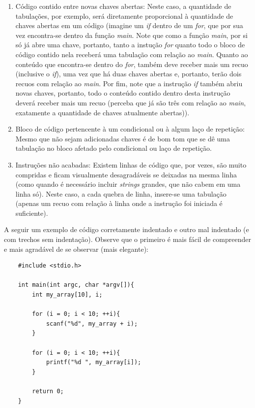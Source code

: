 \documentclass[12pt]{article}
\newcommand\tab[1][1cm]{\hspace*{#1}}
\begin{document}
\begin{enumerate}
    \item Código contido entre novas chaves abertas: Neste caso, a quantidade de tabulações, por exemplo, será diretamente proporcional à quantidade de chaves abertas em um código (imagine um \textit{if} dentro de um \textit{for}, que por sua vez encontra-se dentro da função \textit{main}. Note que como a função \textit{main}, por si só já abre uma chave, portanto, tanto a instução \textit{for} quanto todo o bloco de código contido nela receberá uma tabulação com relação ao \textit{main}. Quanto ao conteúdo que encontra-se dentro do \textit{for}, também deve receber mais um recuo (inclusive o \textit{if}), uma vez que há duas chaves abertas e, portanto, terão dois recuos com relação ao \textit{main}. Por fim, note que a instrução \textit{if} também abriu novas chaves, portanto, todo o conteúdo contido dentro desta instrução deverá receber mais um recuo (perceba que já são três com relação ao \textit{main}, exatamente a quantidade de chaves atualmente abertas)).
    \item Bloco de código pertencente à um condicional ou à algum laço de repetição: Mesmo que não sejam adicionadas chaves é de bom tom que se dê uma tabulação no bloco afetado pelo condicional ou laço de repetição.
    \item Instruções não acabadas: Existem linhas de código que, por vezes, são muito compridas e ficam visualmente desagradáveis se deixadas na mesma linha (como quando é necessário incluir \textit{strings} grandes, que não cabem em uma linha só). Neste caso, a cada quebra de linha, insere-se uma tabulação (apenas um recuo com relação à linha onde a instrução foi iniciada é suficiente).
\end{enumerate}

\par\tab A seguir um exemplo de código corretamente indentado e outro mal indentado (e com trechos sem indentação). Observe que o primeiro é mais fácil de compreender e mais agradável de se observar (mais elegante):

\hspace{0.25cm}
\begin{lstlisting}
    #include <stdio.h>
    
    int main(int argc, char *argv[]){
        int my_array[10], i;
        
        for (i = 0; i < 10; ++i){
            scanf("%d", my_array + i);
        }
        
        for (i = 0; i < 10; ++i){
            printf("%d ", my_array[i]);
        }
        
        return 0;
    }
\end{lstlisting}
\end{document}
